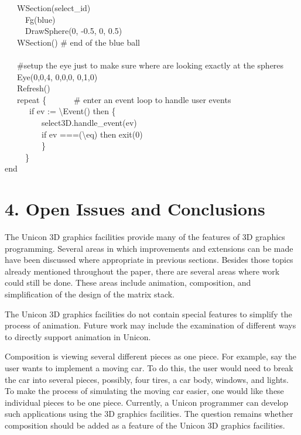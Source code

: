 \documentclass[letterpaper]{article}
\begin{document}
{\ \ \ WSection(select\_id) \\
\ \ \ \ \ Fg({\textquotedbl}blue{\textquotedbl}) \\
\ \ \ \ \ DrawSphere(0, -0.5, 0, 0.5) \\
\ \ \ WSection() \# end of the blue ball \\
\ \\
\ \ \ \#setup the eye just to make sure where are looking exactly at the spheres \\
\ \ \ Eye(0,0,4, 0,0,0, 0,1,0) \\
\ \ \ Refresh() \\
\ \ \ repeat \{ \ \ \ \ \ \ \# enter an event loop to handle user events \\
\ \ \ \ \ \ if ev := {\textbackslash}Event() then \{ \\
\ \ \ \ \ \ \ \ \ select3D.handle\_event(ev) \\
\ \ \ \ \ \ \ \ \ if ev ===({\textquotedbl}{\textbackslash}e{\textquotedbl}{\textbar}{\textquotedbl}q{\textquotedbl}) then
exit(0)\\
\ \ \ \ \ \ \ \ \ \} \\
 \ \ \ \ \ \}\\
end
}



\section[4. Open Issues and Conclusions]{4. Open Issues and Conclusions}


The Unicon 3D graphics facilities provide many of the features of 3D
graphics programming. Several areas in which improvements and
extensions can be made have been discussed where appropriate in
previous sections. Besides those topics already mentioned throughout
the paper, there are several areas where work could still be
done. These areas include animation, composition, and simplification
of the design of the matrix stack.

The Unicon 3D graphics facilities do not contain special features to
simplify the process of animation. Future work may include the
examination of different ways to directly support animation in Unicon.

Composition is viewing several different pieces as one piece. For
example, say the user wants to implement a moving car.  To do this,
the user would need to break the car into several pieces, possibly,
four tires, a car body, windows, and lights. To make the process of
simulating the moving car easier, one would like these individual
pieces to be one piece. Currently, a Unicon programmer can develop
such applications using the 3D graphics facilities. The question
remains whether composition should be added as a feature of the Unicon
3D graphics facilities.
\end{document}
